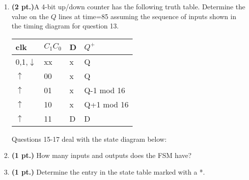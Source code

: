 \documentclass{article}
\begin{document}
\begin{enumerate}
\item {\bf (2 pt.)}A 4-bit up/down counter has the 
following truth table.  Determine the value on the $Q$ lines 
at time=85 assuming the sequence of inputs shown in the 
timing diagram for question 13. 

\begin{tabular}{l|l|l||l}
clk		& $C_1 C_0$	& D & $Q^+$	\\ \hline
0,1,$\downarrow$& xx		& x & Q		\\ \hline
$\uparrow$ 	& 00		& x & Q		\\  \hline
$\uparrow$ 	& 01		& x & Q-1 mod 16\\  \hline
$\uparrow$ 	& 10		& x & Q+1 mod 16\\  \hline
$\uparrow$ 	& 11		& D & D		\\
\end{tabular}


Questions 15-17 deal with the state diagram below:


\item {\bf (1 pt.)} How many inputs and outputs does the FSM have?


\item {\bf (1 pt.)} Determine the entry in the state table marked with a *.


\end{enumerate}
\end{document}
